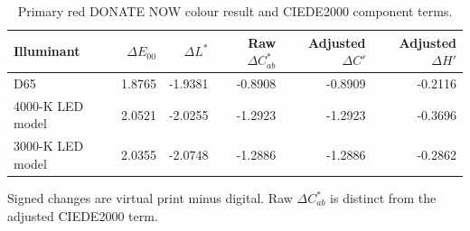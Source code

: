 \begin{table}[!t]
\caption{Primary red DONATE NOW colour result and CIEDE2000 component terms.}
\label{tab:redcolour}\centering\scriptsize
\begin{tabular}{lrrrrr}
\toprule
Illuminant & $\Delta E_{00}$ & $\Delta L^*$ & Raw $\Delta C^*_{ab}$ & Adjusted $\Delta C'$ & Adjusted $\Delta H'$ \\
\midrule
D65 & 1.8765 & -1.9381 & -0.8908 & -0.8909 & -0.2116 \\
4000-K LED model & 2.0521 & -2.0255 & -1.2923 & -1.2923 & -0.3696 \\
3000-K LED model & 2.0355 & -2.0748 & -1.2886 & -1.2886 & -0.2862 \\
\bottomrule
\end{tabular}
\par\vspace{3pt}\footnotesize Signed changes are virtual print minus digital. Raw $\Delta C^*_{ab}$ is distinct from the adjusted CIEDE2000 term.
\end{table}
